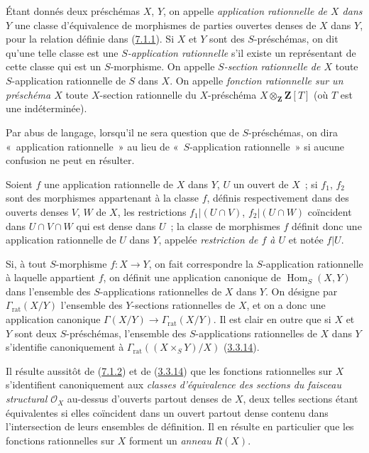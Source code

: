 \begin{definition}[7.1.2]
\label{I.7.1.2-fr}
Étant donnés deux préschémas $X$, $Y$, on appelle
\emph{application rationnelle de $X$ dans $Y$} une classe d'équivalence de
morphismes de parties ouvertes denses de $X$ dans $Y$, pour la relation
définie dans (\hyperref[I.7.1.1-fr]{7.1.1}). Si $X$ et $Y$ sont des
$S$-préschémas, on dit qu'une telle classe est une
\emph{$S$-application rationnelle} s'il existe un représentant de cette classe
qui est un $S$-morphisme. On appelle
\emph{$S$-section rationnelle de $X$} toute $S$-application rationnelle de $S$
dans $X$. On appelle
\emph{fonction rationnelle sur un préschéma $X$} toute $X$-section rationnelle
du $X$-préschéma $X\otimes_{\mathbf{Z}}\mathbf{Z}[T]$ (où $T$ est une
indéterminée).

Par abus de langage, lorsqu'il ne sera question que de $S$-préschémas, on dira
«~application rationnelle~» au lieu de «~$S$-application rationnelle~» si
aucune confusion ne peut en résulter.

Soient $f$ une application rationnelle de $X$ dans $Y$, $U$ un ouvert de
$X$~; si $f_1$, $f_2$ sont des morphismes appartenant à la classe $f$, définis
respectivement dans des ouverts denses $V$, $W$ de $X$, les restrictions
$f_1|(U\cap V)$, $f_2|(U\cap W)$ coïncident dans $U\cap V\cap W$ qui est dense
dans $U$~; la classe de morphismes $f$ définit donc une application rationnelle
de $U$ dans $Y$, appelée
\emph{restriction de $f$ à $U$} et notée $f|U$.

Si, à tout $S$-morphisme $f:X\to Y$, on fait correspondre la $S$-application
rationnelle
à laquelle appartient $f$, on définit une application canonique de
$\operatorname{Hom}_S(X,Y)$ dans l'ensemble des $S$-applications rationnelles
de $X$ dans $Y$. On désigne par $\Gamma_{\mathrm{rat}}(X/Y)$ l'ensemble des
$Y$-sections rationnelles de $X$, et on a donc une application canonique
$\Gamma(X/Y)\to\Gamma_{\mathrm{rat}}(X/Y)$. Il est clair en outre que si $X$ et
$Y$ sont deux $S$-préschémas, l'ensemble des $S$-applications rationnelles de
$X$ dans $Y$ s'identifie canoniquement à
$\Gamma_{\mathrm{rat}}((X\times_S Y)/X)$
(\hyperref[I.3.3.14-fr]{3.3.14}).
\end{definition}

\begin{env}[7.1.3]
\label{I.7.1.3-fr}
Il résulte aussitôt de (\hyperref[I.7.1.2-fr]{7.1.2}) et de
(\hyperref[I.3.3.14-fr]{3.3.14}) que les fonctions rationnelles sur $X$
s'identifient canoniquement aux
\emph{classes d'équivalence des sections du faisceau structural
$\mathscr{O}_X$} au-dessus d'ouverts partout denses de $X$, deux telles
sections étant équivalentes si elles coïncident dans un ouvert partout dense
contenu dans l'intersection de leurs ensembles de définition. Il en résulte en
particulier que les fonctions rationnelles sur $X$ forment un
\emph{anneau} $R(X)$.
\end{env}


